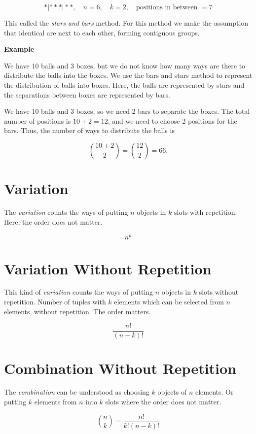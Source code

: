 \[
	*|* * *|* *, \quad n = 6, \quad k = 2, \quad \text{positions in between } = 7
\]

This called the \emph{stars and bars} method. For this method we make the assumption that identical are next to each other, forming contiguous groups.

\textbf{Example}

We have 10 balls and 3 boxes, but we do not know how many ways are there to distribute the balls into the boxes.
We use the bars and stars method to represent the distribution of balls into boxes. Here, the balls are represented by stars and the separations between boxes are represented by bars.

We have 10 balls and 3 boxes, so we need 2 bars to separate the boxes.
The total number of positions is \(10 + 2 = 12\), and we need to choose 2 positions for the bars.
Thus, the number of ways to distribute the balls is

\[
	\binom{10 + 2}{2} = \binom{12}{2} = 66.
\]

\section{Variation}

The \emph{variation} counts the ways of putting \(n\) objects in \(k\) slots with repetition. Here, the order does not matter.

\[
	n^k
\]

\section{Variation Without Repetition}

This kind of \emph{variation}  counts the ways of putting \(n\) objects in \(k\) slots without repetition. Number of tuples with \(k\)
elements which can be selected from \(n\) elements, without repetition. The order matters.

\[
	\frac{n!}{(n - k)!}
\]

\section{Combination Without Repetition}

The \emph{combination} can be understood as choosing \(k\) objects of \(n\) elements. Or putting \(k\) elements from \(n\) into \(k\) slots where the order does not matter.

\[
	\binom{n}{k} = \frac{n!}{k!(n-k)!}
\]

